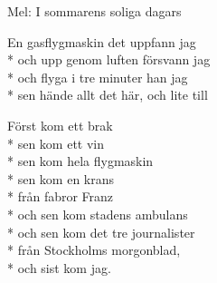 \begin{SongText}[Gasflygmaskinen]
    \begin{SongInfo}
        Mel: I sommarens soliga dagars
    \end{SongInfo}
    \begin{SongVerse}
        En gasflygmaskin det uppfann jag\\*%
        och upp genom luften försvann jag\\*%
        och flyga i tre minuter han jag\\*%
        sen hände allt det här, och lite till
    \end{SongVerse}
    \begin{SongVerse}
        Först kom ett brak\\*%
        sen kom ett vin\\*%
        sen kom hela flygmaskin\\*%
        sen kom en krans\\*%
        från fabror Franz\\*%
        och sen kom stadens ambulans\\*%
        och sen kom det tre journalister\\*%
        från Stockholms morgonblad,\\*%
        och sist kom jag.
    \end{SongVerse}
\end{SongText}
